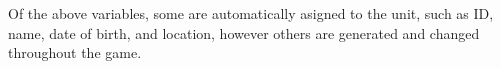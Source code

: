 Of the above variables, some are automatically asigned to the unit, such as ID, name, date of birth, and location, however others are generated and changed throughout the game. 




